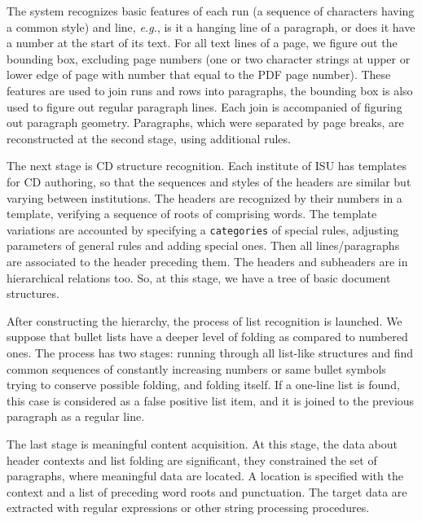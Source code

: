 \documentclass[
]{aiitart}
\begin{document}
The system recognizes basic features of each run (a sequence of characters having a common style) and line, \emph{e.g.}, is it a hanging line of a paragraph, or does it have a number at the start of its text.  For all text lines of a page, we figure out the bounding box, excluding page numbers (one or two character strings at upper or lower edge of page with number that equal to the PDF page number). These features are used to join runs and rows into paragraphs, the bounding box is also used to figure out regular paragraph lines.  Each join is accompanied of figuring out paragraph geometry. Paragraphs, which were separated by page breaks, are reconstructed at the second stage, using additional rules.

The next stage is CD structure recognition.  Each institute of ISU has templates for CD authoring, so that the sequences and styles of the headers are similar but varying between institutions.  The headers are recognized by their numbers in a template, verifying a sequence of roots of comprising words.  The template variations are accounted by specifying a \verb|categories| of special rules, adjusting parameters of general rules and adding special ones.  Then all lines/paragraphs are associated to the header preceding them.  The headers and subheaders are in hierarchical relations too.  So, at this stage, we have a tree of basic document structures.

After constructing the hierarchy, the process of list recognition is launched.  We suppose that bullet lists have a deeper level of folding as compared to numbered ones.  The process has two stages: running through all list-like structures and find common sequences of constantly increasing numbers or same bullet symbols trying to conserve possible folding, and folding itself.  If a one-line list is found, this case is considered as a false positive list item, and it is joined to the previous paragraph as a regular line.  %

The last stage is meaningful content acquisition.  At this stage, the data about header contexts and list folding are significant, they constrained the set of paragraphs, where meaningful data are located.  A location is specified with the context and a list of preceding word roots and punctuation. The target data are extracted with regular expressions or other string processing procedures.
\end{document}
